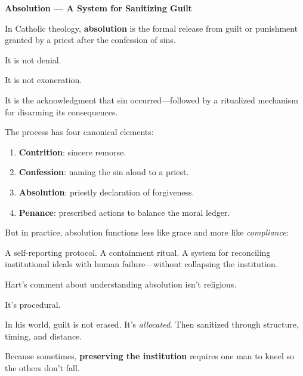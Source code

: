 \begin{TechnicalSidebar}{\textbf{Absolution --- A System for Sanitizing Guilt}}

    In Catholic theology, \textbf{absolution} is the formal release from guilt or 
    punishment granted by a priest after the confession of sins.
    
    \medskip
    
    It is not denial.

    \medskip
    
    
    It is not exoneration.

    \medskip
    
    It is the acknowledgment that sin occurred—followed by a ritualized mechanism for disarming 
    its consequences.
    
    \medskip
    
    The process has four canonical elements:

    \medskip
    
    \begin{enumerate}
        \item \textbf{Contrition}: sincere remorse.
        \item \textbf{Confession}: naming the sin aloud to a priest.
        \item \textbf{Absolution}: priestly declaration of forgiveness.
        \item \textbf{Penance}: prescribed actions to balance the moral ledger.
    \end{enumerate}
    
    \medskip
    
    But in practice, absolution functions less like grace and more like \textit{compliance}:

    \medskip
    
    
    A self-reporting protocol.  
    A containment ritual.  
    A system for reconciling institutional ideals with human failure—without collapsing the 
    institution.
    
    \medskip
    
    Hart’s comment about understanding absolution isn’t religious.

    \medskip
    
    
    It’s procedural.

    \medskip
    
    
    In his world, guilt is not erased.  
    It’s \textit{allocated}.  
    Then sanitized through structure, timing, and distance.

    \medskip
    
    Because sometimes, \textbf{preserving the institution} requires one man to kneel so the others 
    don’t fall.
    
\end{TechnicalSidebar}
